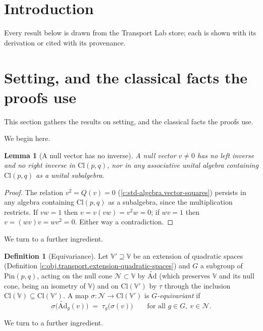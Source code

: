 \documentclass[11pt]{article}
\newtheorem{lemma}[theorem]{Lemma}
\theoremstyle{definition}
\newtheorem{definition}[theorem]{Definition}
\theoremstyle{plain}
\newcommand{\changedmark}[2]{\marginpar{\raggedright\scriptsize\color{#1}#2}}
\providecommand{\Ad}{}\renewcommand{\Ad}{\widetilde{\mathrm{Ad}}}
\providecommand{\Cl}{}\renewcommand{\Cl}{\mathrm{Cl}}
\providecommand{\Ncone}{}\renewcommand{\Ncone}{\mathcal{N}}
\providecommand{\Pin}{}\renewcommand{\Pin}{\mathrm{Pin}}
\begin{document}
\section*{Introduction}
Every result below is drawn from the Transport Lab store; each is shown with its derivation or cited with its provenance.

\section{Setting, and the classical facts the proofs use}

This section gathers the results on setting, and the classical facts the proofs use.

We begin here.

\begin{lemma}[A null vector has no inverse]\label{c:transport.noinverse}
\changedmark{gray}{reworded}
A null vector $v \neq 0$ has no left inverse and no right inverse in $\Cl(p,q)$, nor in any associative unital algebra containing $\Cl(p,q)$ as a unital subalgebra.
\end{lemma}
\begin{proof}
The relation $v^2 = Q(v) = 0$ (\ref{c:std-algebra.vector-squares}) persists in any algebra containing $\Cl(p,q)$ as a subalgebra, since the multiplication restricts. If $vw = 1$ then $v = v(vw) = v^2 w = 0$; if $wv = 1$ then $v = (wv)v = wv^2 = 0$. Either way a contradiction.

\end{proof}

We turn to a further ingredient.

\begin{definition}[Equivariance]\label{c:obj.transport.equivariance}
Let $\mathbb{V}' \supseteq \mathbb{V}$ be an extension of quadratic spaces (Definition \ref{c:obj.transport.extension-quadratic-spaces}) and $G$ a subgroup of $\Pin(p,q)$, acting on the null cone $\Ncone \subset \mathbb{V}$ by $\Ad$ (which preserves $\mathbb{V}$ and its null cone, being an isometry of $\mathbb{V}$) and on $\Cl(\mathbb{V}')$ by $\tau$ through the inclusion $\Cl(\mathbb{V}) \subseteq \Cl(\mathbb{V}')$. A map $\sigma : \Ncone \to \Cl(\mathbb{V}')$ is \emph{$G$-equivariant} if
\[
\sigma\bigl(\Ad_g(v)\bigr) \;=\; \tau_g\bigl(\sigma(v)\bigr) \qquad \text{for all } g \in G,\ v \in \Ncone .
\]
\end{definition}

We turn to a further ingredient.
\end{document}
